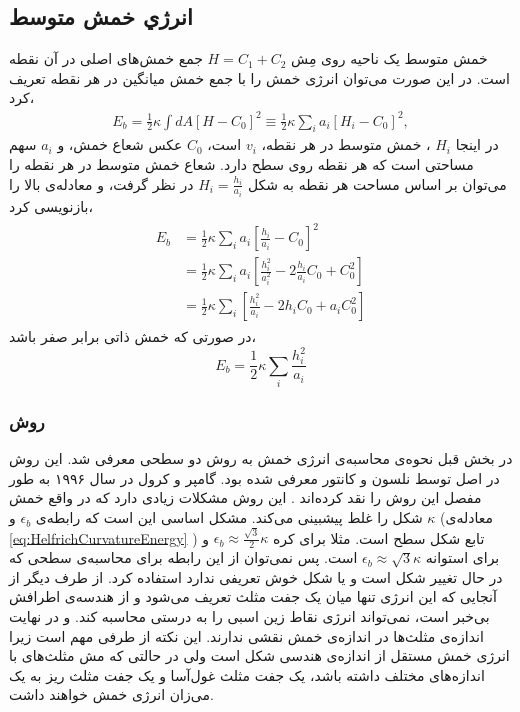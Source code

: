 \setRL



\subsection{
انرژي خمش متوسط
}


خمش متوسط یک ناحیه روی مِش 
$H=C_1+C_2$
جمع خمش‌های اصلی در آن نقطه است. در این صورت می‌توان انرژی خمش را با جمع خمش میانگین در هر نقطه تعریف کرد،
\begin{eqnarray}
E_{b}=\frac{1}{2}\kappa\int dA \left[H-C_0\right]^2\equiv\frac{1}{2}\kappa\sum_i a_i \left[H_i-C_0\right]^2,
\label{eq:bendingDiscretisation}
\end{eqnarray}
در اینجا 
$H_i$
، خمش متوسط در هر نقطه،  
$v_i$
است، 
$C_0$
عکس شعاع خمش،  و 
$a_i$
سهم مساحتی است که هر نقطه روی سطح دارد. شعاع خمش متوسط در هر نقطه را می‌توان بر اساس مساحت هر نقطه به شکل 
$H_i=\frac{h_i}{a_i}$
 در نظر گرفت، و معادله‌ی بالا را بازنویسی کرد،
\begin{eqnarray}
\begin{aligned}
E_{b}&=\frac{1}{2}\kappa\sum_i a_i \left[\frac{h_i}{a_i}-C_0\right]^2\\
&=\frac{1}{2}\kappa\sum_i a_i \left[\frac{h_i^2}{a_i^2}-2\frac{h_i}{a_i}C_0+C_0^2\right]\\
&=\frac{1}{2}\kappa\sum_i \left[\frac{h_i^2}{a_i}-2h_iC_0+a_iC_0^2\right]
\end{aligned}
\label{eq:bendingDiscretisationSpontaneous}
\end{eqnarray}
در صورتی که خمش ذاتی برابر صفر باشد، 
\begin{equation}
E_{b}=\frac{1}{2}\kappa\sum_i \frac{h_i^2}{a_i}
\end{equation}


\subsubsection{
روش 
}
در بخش قبل نحوه‌ی محاسبه‌ی انرژی خمش به روش دو سطحی
معرفی شد. این روش در اصل توسط نلسون و کانتور
\cite{NelsonPRL1987}
معرفی شده بود. گامپر و کرول در سال ۱۹۹۶ به طور مفصل این روش را نقد کرده‌اند
\cite{gompper1996}
. این روش مشکلات زیادی دارد که در واقع خمش شکل را غلط پیشبینی می‌کند. مشکل اساسی این است که رابطه‌ی 
$\epsilon_b$
و 
$\kappa$
(معادله‌ی  
\ref{eq:HelfrichCurvatureEnergy}
) تابع شکل سطح است.  مثلا برای کره
$\epsilon_b\approx\frac{\sqrt{3}}{2}\kappa$
و برای استوانه
$\epsilon_b\approx\sqrt{3}\kappa$
است. پس نمی‌توان از این رابطه برای محاسبه‌ی سطحی که در حال تغییر شکل است و یا شکل خوش تعریفی ندارد استفاده کرد. 
از طرف دیگر از آنجایی که این انرژی تنها میان یک جفت مثلث تعریف می‌شود و از هندسه‌ی اطرافش بی‌خبر است، نمی‌تواند انرژی نقاط زین اسبی را به درستی محاسبه کند. و در نهایت اندازه‌ی مثلث‌ها در اندازه‌ی خمش نقشی ندارند. این نکته از طرفی مهم است زیرا انرژی خمش مستقل از اندازه‌ی هندسی شکل است ولی در حالتی که مش مثلث‌های با اندازه‌های مختلف داشته باشد، یک جفت مثلث غول‌آسا و یک جفت مثلث ریز به یک می‌زان انرژی خمش خواهند داشت.

